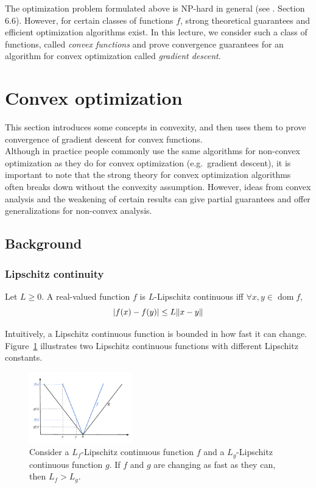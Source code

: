 \documentclass{article}
\DeclareMathOperator*{\dom}{dom}
\DeclarePairedDelimiter{\abs}{\lvert}{\rvert}
\DeclarePairedDelimiter{\norm}{\lVert}{\rVert}
\begin{document}
The optimization problem formulated above is NP-hard in general (see \cite{bubeck2015convex}. Section 6.6). However, for certain classes of functions $f$, strong theoretical guarantees and efficient optimization algorithms exist. In this lecture, we consider such a class of functions, called \emph{convex functions} and prove convergence guarantees for an algorithm for convex optimization called \emph{gradient descent}.


\section{Convex optimization}

    This section introduces some concepts in convexity, and then uses them to prove convergence of gradient descent for convex functions.\\
    
    Although in practice people commonly use the same algorithms for non-convex optimization as they do for convex optimization (e.g.\ gradient descent), it is important to note that the strong theory for convex optimization algorithms often breaks down without the convexity assumption.
    However, ideas from convex analysis and the weakening of certain results can give partial guarantees and offer generalizations for non-convex analysis.


\subsection{Background}

\subsubsection{Lipschitz continuity}

\begin{defn}
Let $L\geq 0$. A real-valued function $f$ is $L$-Lipschitz continuous iff $\forall x,y \in \dom f$,
\[
	\abs{f(x) - f(y)} \leq L\norm{x-y}
\]
\end{defn}

Intuitively, a Lipschitz continuous function is bounded in how fast it can change. Figure~\ref{fig:lipschitz} illustrates two Lipschitz continuous functions with different Lipschitz constants.

\begin{figure}[ht]
\centering
    \includegraphics[width=0.4\textwidth]{figures/Lipschitz.pdf}
    \caption{Consider a $L_f$-Lipschitz continuous function $f$ and a $L_g$-Lipschitz continuous function $g$. If $f$ and $g$ are changing as fast as they can, then $L_f > L_g$.}
    \label{fig:lipschitz}
\end{figure}
\end{document}
